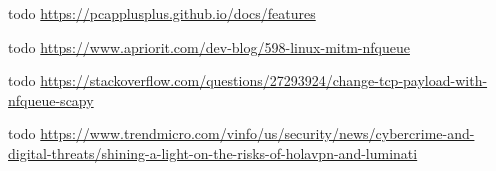 \documentclass[12pt]{article}
\begin{document}
\begin{thebibliography}{1}
		todo
			\url{https://pcapplusplus.github.io/docs/features}

		todo
			\url{https://www.apriorit.com/dev-blog/598-linux-mitm-nfqueue}

		todo
			\url{https://stackoverflow.com/questions/27293924/change-tcp-payload-with-nfqueue-scapy}

		todo
			\url{https://www.trendmicro.com/vinfo/us/security/news/cybercrime-and-digital-threats/shining-a-light-on-the-risks-of-holavpn-and-luminati}

	\end{thebibliography}
		
	\pagebreak
	
	
\end{document}
